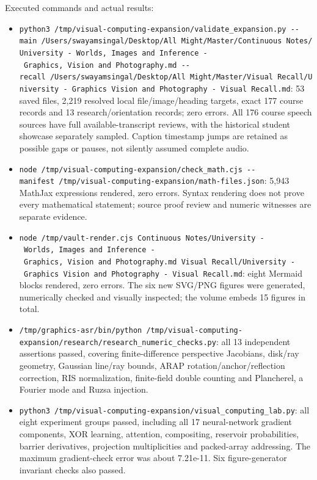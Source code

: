 Executed commands and actual results:

\begin{itemize}
\tightlist
\item
  \texttt{python3\ /tmp/visual-computing-expansion/validate\_expansion.py\ -\/-main\ \textquotesingle{}/Users/swayamsingal/Desktop/All\ Might/Master/Continuous\ Notes/University\ -\ Worlds,\ Images\ and\ Inference\ -\ Graphics,\ Vision\ and\ Photography.md\textquotesingle{}\ -\/-recall\ \textquotesingle{}/Users/swayamsingal/Desktop/All\ Might/Master/Visual\ Recall/University\ -\ Graphics\ Vision\ and\ Photography\ -\ Visual\ Recall.md\textquotesingle{}}: 53 saved files, 2,219 resolved local file/image/heading targets, exact 177 course records and 13 research/orientation records; zero errors. All 176 course speech sources have full available-transcript reviews, with the historical student showcase separately sampled. Caption timestamp jumps are retained as possible gaps or pauses, not silently assumed complete audio.
\item
  \texttt{node\ /tmp/visual-computing-expansion/check\_math.cjs\ -\/-manifest\ /tmp/visual-computing-expansion/math-files.json}: 5,943 MathJax expressions rendered, zero errors. Syntax rendering does not prove every mathematical statement; source proof review and numeric witnesses are separate evidence.
\item
  \texttt{node\ /tmp/vault-render.cjs\ \textquotesingle{}Continuous\ Notes/University\ -\ Worlds,\ Images\ and\ Inference\ -\ Graphics,\ Vision\ and\ Photography.md\textquotesingle{}\ \textquotesingle{}Visual\ Recall/University\ -\ Graphics\ Vision\ and\ Photography\ -\ Visual\ Recall.md\textquotesingle{}}: eight Mermaid blocks rendered, zero errors. The six new SVG/PNG figures were generated, numerically checked and visually inspected; the volume embeds 15 figures in total.
\item
  \texttt{/tmp/graphics-asr/bin/python\ /tmp/visual-computing-expansion/research/research\_numeric\_checks.py}: all 13 independent assertions passed, covering finite-difference perspective Jacobians, disk/ray geometry, Gaussian line/ray bounds, ARAP rotation/anchor/reflection correction, RIS normalization, finite-field double counting and Plancherel, a Fourier mode and Ruzsa injection.
\item
  \texttt{python3\ /tmp/visual-computing-expansion/visual\_computing\_lab.py}: all eight experiment groups passed, including all 17 neural-network gradient components, XOR learning, attention, compositing, reservoir probabilities, barrier derivatives, projection multiplicities and packed-array addressing. The maximum gradient-check error was about 7.21e-11. Six figure-generator invariant checks also passed.

\end{itemize}
